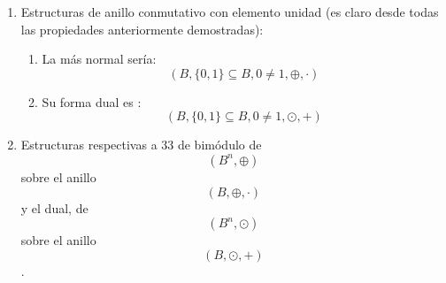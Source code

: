 \begin{enumerate}
\begin{enumerate}
\begin{enumerate}
\begin{enumerate}
\begin{enumerate}
          \[{= {{{{({\overline{y} + z})} \cdot {({y + \overline{z}})}} \cdot {({y + z})}} \cdot {({\overline{y} + \overline{z}})}}} =\]
        \item
          \[{= {{({\overline{y} + {({z \cdot \overline{z}})}})} \cdot {({y + {({z \cdot \overline{z}})}})}}} =\]
        \item
          \[{= {z \cdot \overline{z}}} = 0\]
        \item
          \[\text{De}{\lbrack\mathbf{A}\rbrack}\text{y de}{\lbrack\mathbf{B}\rbrack}\text{se obtiene que}{\overline{({x+{({y\odot z})}})} = \overline{({{({x+y})}\odot{({x+z})}})}}\]
        \item
          \[\text{Y de aquí, por la unicidad del complementario obtenemos}\]
        \item
          \[{{x + {({y \odot z})}} = {({x + y})}} \odot {({x + z})}\]
        \end{enumerate}
      \end{enumerate}
    \item
      Estructuras de anillo conmutativo con elemento unidad (es claro
      desde todas las pro\-piedades anteriormente demostradas):

      \begin{enumerate}
      \def\labelenumiv{\arabic{enumiv}.}
      \tightlist
      \item
        La más normal sería:
        \[({B,{{\{ 0,1\}} \subseteq B},{0 \neq 1}, \oplus , \cdot})\]
      \item
        Su forma dual es
        :\[({B,{{\{ 0,1\}} \subseteq B},{0 \neq 1}, \odot , +})\]
      \end{enumerate}
    \item
      Estructuras respectivas a 33 de bimódulo
      de\[({B^{n}, \oplus})\]sobre el anillo \[({B, \oplus , \cdot})\] y
      el dual, de \[({B^{n}, \odot})\]sobre el anillo
      \[({B, \odot , +})\].
    \end{enumerate}
  \end{enumerate}
\end{enumerate}
